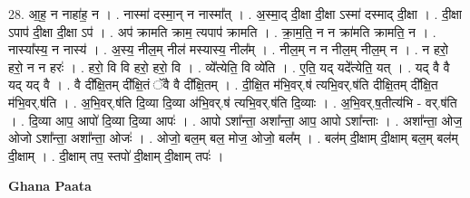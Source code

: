 \documentclass[17pt]{extarticle}
\begin{document}
28. आ॒ह॒ न नाहा॑ह॒ न । . नास्मा॑ दस्मा॒न् न नास्मा᳚त् । . अ॒स्मा॒द् दी॒क्षा दी॒क्षा ऽस्मा॑ दस्माद् दी॒क्षा । . दी॒क्षा ऽपाप॑ दी॒क्षा दी॒क्षा ऽप॑ । . अप॑ क्रामति क्राम॒ त्यपाप॑ क्रामति । . क्रा॒म॒ति॒ न न क्रा॑मति क्रामति॒ न । . नास्या᳚स्य॒ न नास्य॑ । . अ॒स्य॒ नील॒म् नील॑ मस्यास्य॒ नील᳚म् । . नील॒म् न न नील॒म् नील॒म् न । . न हरो॒ हरो॒ न न हरः॑ । . हरो॒ वि वि हरो॒ हरो॒ वि । . व्ये᳚त्येति॒ वि व्ये॑ति । . ए॒ति॒ यद् यदे᳚त्येति॒ यत् । . यद् वै वै यद् यद् वै । . वै दी᳚क्षि॒तम् दी᳚क्षि॒तं ॅवै वै दी᳚क्षि॒तम् । . दी॒क्षि॒त म॑भि॒वर्.ष॑ त्यभि॒वर्.ष॑ति दीक्षि॒तम् दी᳚क्षि॒त म॑भि॒वर्.ष॑ति । . अ॒भि॒वर्.ष॑ति दि॒व्या दि॒व्या अ॑भि॒वर्.ष॑ त्यभि॒वर्.ष॑ति दि॒व्याः । . अ॒भि॒वर्.ष॒तीत्य॑भि - वर्.ष॑ति । . दि॒व्या आप॒ आपो॑ दि॒व्या दि॒व्या आपः॑ । . आपो ऽशा᳚न्ता॒ अशा᳚न्ता॒ आप॒ आपो ऽशा᳚न्ताः । . अशा᳚न्ता॒ ओज॒ ओजो ऽशा᳚न्ता॒ अशा᳚न्ता॒ ओजः॑ । . ओजो॒ बल॒म् बल॒ मोज॒ ओजो॒ बल᳚म् । . बल॑म् दी॒क्षाम् दी॒क्षाम् बल॒म् बल॑म् दी॒क्षाम् । . दी॒क्षाम् तप॒ स्तपो॑ दी॒क्षाम् दी॒क्षाम् तपः॑ । \newline

\textbf{Ghana Paata } \newline
\end{document}
